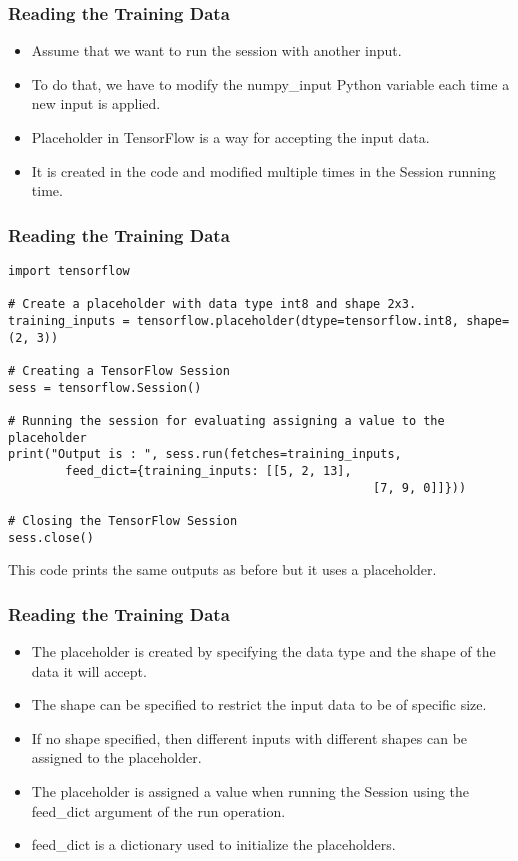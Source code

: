 \begin{frame}[fragile] \frametitle{Reading the Training Data}

\begin{itemize}
\item Assume that we want to run the session with another input. 
\item To do that, we have to modify the numpy\_input Python variable each time a new input is applied.
\item Placeholder in TensorFlow is a way for accepting the input data.
\item It is created in the code and modified multiple times in the Session running time. 
\end{itemize}
\end{frame}

\begin{frame}[fragile] \frametitle{Reading the Training Data}
\begin{lstlisting}
import tensorflow  
   
# Create a placeholder with data type int8 and shape 2x3.  
training_inputs = tensorflow.placeholder(dtype=tensorflow.int8, shape=(2, 3))  
   
# Creating a TensorFlow Session  
sess = tensorflow.Session()  
   
# Running the session for evaluating assigning a value to the placeholder  
print("Output is : ", sess.run(fetches=training_inputs,  
		feed_dict={training_inputs: [[5, 2, 13],  
                                                   [7, 9, 0]]}))  

# Closing the TensorFlow Session  
sess.close()  
\end{lstlisting}
This code prints the same outputs as before but it uses a placeholder.
\end{frame}

\begin{frame}[fragile] \frametitle{Reading the Training Data}

\begin{itemize}
\item The placeholder is created by specifying the data type and the shape of the data it will accept. 
\item The shape can be specified to restrict the input data to be of specific size.
\item If no shape specified, then different inputs with different shapes can be assigned to the placeholder.
\item The placeholder is assigned a value when running the Session using the feed\_dict argument of the run operation. 
\item  feed\_dict is a dictionary used to initialize the placeholders.
\end{itemize}
\end{frame}

